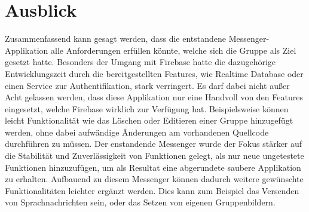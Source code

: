 \section{Ausblick}
Zusammenfassend kann gesagt werden, dass die entstandene Messenger-Applikation alle Anforderungen erfüllen könnte, welche sich die Gruppe als Ziel gesetzt hatte. Besonders der Umgang mit Firebase hatte die dazugehörige Entwicklungszeit durch die bereitgestellten Features, wie Realtime Database oder einen Service zur Authentifikation, stark verringert. 
Es darf dabei nicht außer Acht gelassen werden, dass diese Applikation nur eine Handvoll von den Features eingesetzt, welche Firebase wirklich zur Verfügung hat. Beispielsweise können leicht Funktionalität wie das Löschen oder Editieren einer Gruppe hinzugefügt werden, ohne dabei aufwändige Änderungen am vorhandenen Quellcode durchführen zu müssen. 
Der enstandende Messenger wurde der Fokus stärker auf die Stabilität und Zuverlässigkeit von Funktionen gelegt, als nur neue ungetestete Funktionen hinzuzufügen, um als Resultat eine abgerundete saubere Applikation zu erhalten. Aufbauend zu diesem Messenger können dadurch weitere gewünschte Funktionalitäten leichter ergänzt werden. Dies kann zum Beispiel das Versenden von Sprachnachrichten sein, oder das Setzen von eigenen Gruppenbildern.
